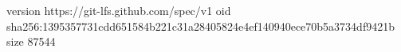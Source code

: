 version https://git-lfs.github.com/spec/v1
oid sha256:1395357731cdd651584b221c31a28405824e4ef140940ece70b5a3734df9421b
size 87544
